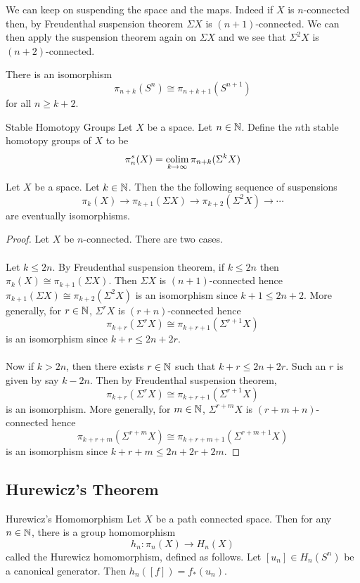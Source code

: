 \documentclass[a4paper]{article}
\begin{document}
We can keep on suspending the space and the maps. Indeed if $X$ is $n$-connected then, by Freudenthal suspension theorem $\Sigma X$ is $(n+1)$-connected. We can then apply the suspension theorem again on $\Sigma X$ and we see that $\Sigma^2X$ is $(n+2)$-connected. 

\begin{crl}{}{} There is an isomorphism $$\pi_{n+k}(S^n)\cong\pi_{n+k+1}(S^{n+1})$$ for all $n\geq k+2$. 
\end{crl}

\begin{defn}{Stable Homotopy Groups}{} Let $X$ be a space. Let $n\in\mathbb{N}$. Define the $n$th stable homotopy groups of $X$ to be $$\pi_n^s(X)=\operatorname*{colim}_{k\to\infty}\pi_{n+k}(\Sigma^kX)$$
\end{defn}

\begin{prp}{}{} Let $X$ be a space. Let $k\in\mathbb{N}$. Then the the following sequence of suspensions $$\pi_k(X)\to\pi_{k+1}(\Sigma X)\to\pi_{k+2}(\Sigma^2X)\to\cdots$$ are eventually isomorphisms. \tcbline
\begin{proof}
Let $X$ be $n$-connected. There are two cases. \\~\\

Let $k\leq 2n$. By Freudenthal suspension theorem, if $k\leq 2n$ then $\pi_k(X)\cong\pi_{k+1}(\Sigma X)$. Then $\Sigma X$ is $(n+1)$-connected hence $\pi_{k+1}(\Sigma X)\cong\pi_{k+2}(\Sigma^2X)$ is an isomorphism since $k+1\leq 2n+2$. More generally, for $r\in\mathbb{N}$, $\Sigma^rX$ is $(r+n)$-connected hence $$\pi_{k+r}(\Sigma^rX)\cong\pi_{k+r+1}(\Sigma^{r+1}X)$$ is an isomorphism since $k+r\leq 2n+2r$. \\~\\

Now if $k>2n$, then there exists $r\in\mathbb{N}$ such that $k+r\leq 2n+2r$. Such an $r$ is given by say $k-2n$. Then by Freudenthal suspension theorem, $$\pi_{k+r}(\Sigma^rX)\cong\pi_{k+r+1}(\Sigma^{r+1}X)$$ is an isomorphism. More generally, for $m\in\mathbb{N}$, $\Sigma^{r+m}X$ is $(r+m+n)$-connected hence $$\pi_{k+r+m}(\Sigma^{r+m}X)\cong\pi_{k+r+m+1}(\Sigma^{r+m+1}X)$$ is an isomorphism since $k+r+m\leq 2n+2r+2m$. 
\end{proof}
\end{prp}

\subsection{Hurewicz's Theorem}
\begin{thm}{Hurewicz's Homomorphism}{} Let $X$ be a path connected space. Then for any $n\in\mathbb{N}$, there is a group homomorphism $$h_n:\pi_n(X)\to H_n(X)$$ called the Hurewicz homomorphism, defined as follows. Let $[u_n]\in H_n(S^n)$ be a canonical generator. Then $h_n([f])=f_\ast(u_n)$. 
\end{thm}
\end{document}
